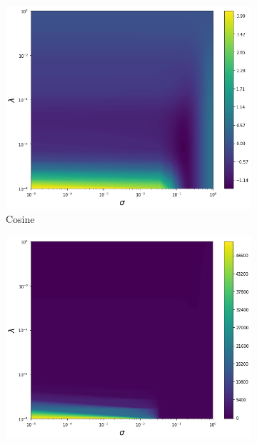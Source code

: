 

\begin{figure}[H]
    \centering
    \begin{subfigure}[b]{0.32\textwidth}
        \includegraphics[width=\textwidth]{figures/score_matching/loss/lossCosine.png}
        \caption{Cosine}
    \end{subfigure}
    \begin{subfigure}[b]{0.32\textwidth}
        \includegraphics[width=\textwidth]{figures/score_matching/loss/lossBanana.png}

\end{subfigure}
\end{figure}
